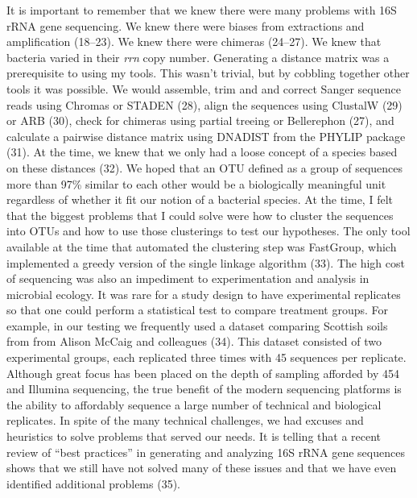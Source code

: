 \documentclass[11pt,]{article}
\begin{document}
It is important to remember that we knew there were many problems with
16S rRNA gene sequencing. We knew there were biases from extractions and
amplification (18--23). We knew there were chimeras (24--27). We knew
that bacteria varied in their \emph{rrn} copy number. Generating a
distance matrix was a prerequisite to using my tools. This wasn't
trivial, but by cobbling together other tools it was possible. We would
assemble, trim and and correct Sanger sequence reads using Chromas or
STADEN (28), align the sequences using ClustalW (29) or ARB (30), check
for chimeras using partial treeing or Bellerephon (27), and calculate a
pairwise distance matrix using DNADIST from the PHYLIP package (31). At
the time, we knew that we only had a loose concept of a species based on
these distances (32). We hoped that an OTU defined as a group of
sequences more than 97\% similar to each other would be a biologically
meaningful unit regardless of whether it fit our notion of a bacterial
species. At the time, I felt that the biggest problems that I could
solve were how to cluster the sequences into OTUs and how to use those
clusterings to test our hypotheses. The only tool available at the time
that automated the clustering step was FastGroup, which implemented a
greedy version of the single linkage algorithm (33). The high cost of
sequencing was also an impediment to experimentation and analysis in
microbial ecology. It was rare for a study design to have experimental
replicates so that one could perform a statistical test to compare
treatment groups. For example, in our testing we frequently used a
dataset comparing Scottish soils from from Alison McCaig and colleagues
(34). This dataset consisted of two experimental groups, each replicated
three times with 45 sequences per replicate. Although great focus has
been placed on the depth of sampling afforded by 454 and Illumina
sequencing, the true benefit of the modern sequencing platforms is the
ability to affordably sequence a large number of technical and
biological replicates. In spite of the many technical challenges, we had
excuses and heuristics to solve problems that served our needs. It is
telling that a recent review of ``best practices'' in generating and
analyzing 16S rRNA gene sequences shows that we still have not solved
many of these issues and that we have even identified additional
problems (35).
\end{document}
